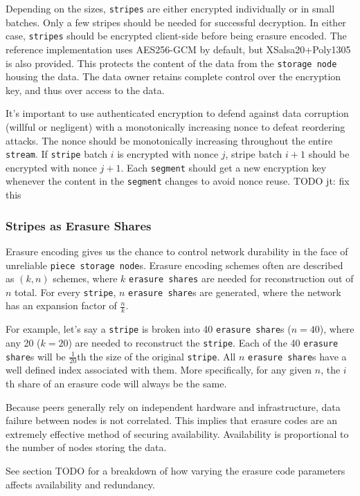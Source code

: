 \documentclass[a4paper,10pt]{article} \usepackage[utf8]{inputenc}
\newcommand{\x}[1]{{\tt #1}} \newcommand{\code}[1]{{\tt #1}}
\newcommand{\todo}[1]{{\color{red} TODO #1 }}
\begin{document}
Depending on the sizes, \x{stripes} are either encrypted individually or in
small batches. Only a few stripes should be needed for successful
decryption. In either case, \x{stripes} should be encrypted client-side before
being erasure encoded. The reference implementation uses AES256-GCM by default,
but XSalsa20+Poly1305 is also provided. This protects the
content of the data from the \x{storage node} housing the data. The data owner
retains complete control over the encryption key, and thus over access to the
data.

It's important to use authenticated encryption to defend against data corruption
(willful or negligent) with a monotonically increasing nonce to defeat
reordering attacks. The nonce should be monotonically increasing throughout
the entire \x{stream}. If \x{stripe} batch $i$ is encrypted
with nonce $j$, stripe batch $i+1$ should be encrypted with nonce $j+1$. Each
\x{segment} should get a new encryption key whenever the content in the
\x{segment} changes to avoid nonce reuse. \todo{jt: fix this}

\subsubsection{Stripes as Erasure Shares}

Erasure encoding gives us the chance to control network durability in the face
of unreliable \x{piece storage node}s. Erasure encoding schemes often are
described as $(k, n)$ schemes, where $k$ \x{erasure shares} are needed for
reconstruction out of $n$ total. For every \x{stripe}, $n$ \x{erasure share}s
are generated, where the network has an expansion factor of $\frac{n}{k}$.

For example, let's say a \x{stripe} is broken into 40 \x{erasure share}s
($n=40$), where any 20 ($k=20$) are needed to reconstruct the \x{stripe}. Each
of the 40 \x{erasure share}s will be $\frac{1}{20}$th the size of the original
\x{stripe}. All $n$ \x{erasure share}s have a well defined index associated
with them. More specifically, for any given $n$, the $i$th share of an erasure code will always be the same.

Because peers generally rely on independent hardware and infrastructure, data
failure between nodes is not correlated. This implies that erasure codes are an extremely effective method of securing availability. Availability is proportional to the number of nodes storing the data.

See section \todo{} for a breakdown of how varying the erasure code parameters
affects availability and redundancy.
\end{document}
